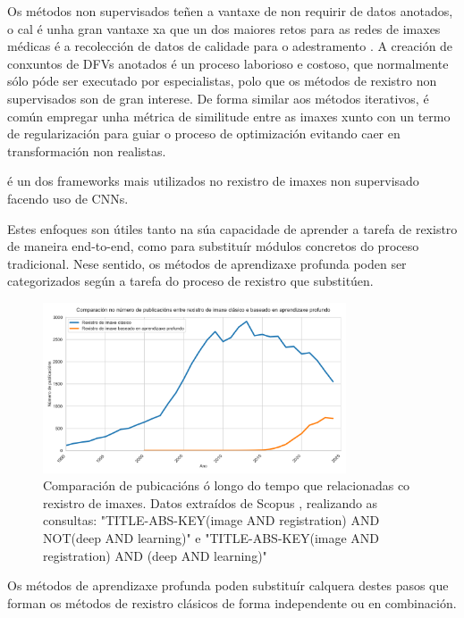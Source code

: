 Os métodos non supervisados teñen a vantaxe de non requirir de datos anotados, o cal é unha gran vantaxe xa que un dos maiores retos para as redes de imaxes médicas é a recolección de datos de calidade para o adestramento \cite{medicalimageanalysis}.
A creación de conxuntos de DFVs anotados é un proceso laborioso e costoso, que normalmente sólo póde ser executado por especialistas, polo que os métodos de rexistro non supervisados son de gran interese.
De forma similar aos métodos iterativos, é común empregar unha métrica de similitude entre as imaxes xunto con un termo de regularización para guiar o proceso de optimización evitando caer en transformación non realistas.

\cite{Balakrishnan_2019voxelmorph} é un dos frameworks mais utilizados no rexistro de imaxes non supervisado facendo uso de CNNs.

Estes enfoques son útiles tanto na súa capacidade de aprender a tarefa de rexistro de maneira end-to-end, como para substituír módulos concretos do proceso tradicional.
Nese sentido, os métodos de aprendizaxe profunda poden ser categorizados según a tarefa do proceso de rexistro que substitúen.

\begin{figure}[hp!]
\centering
\includegraphics[width=0.8\textwidth]{imaxes/methods_comp.png}
\caption{Comparación de pubicacións ó longo do tempo que relacionadas co rexistro de imaxes. Datos extraídos de Scopus \cite{scopus}, realizando as consultas: "TITLE-ABS-KEY(image AND registration) AND NOT(deep AND learning)" e "TITLE-ABS-KEY(image AND registration) AND (deep AND learning)"}
\label{fig:method_comp}
\end{figure}

Os métodos de aprendizaxe profunda poden substituír calquera destes pasos que forman os métodos de rexistro clásicos de forma independente ou en combinación.

